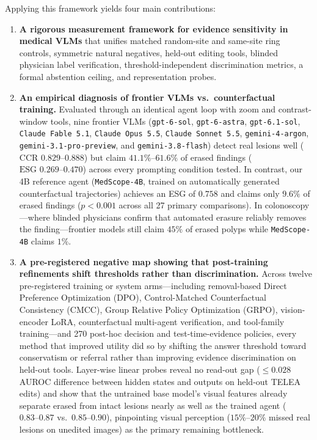 \documentclass{article} %
\begin{document}
Applying this framework yields four main contributions:
\begin{enumerate}[leftmargin=*,nosep]
    \item \textbf{A rigorous measurement framework for evidence sensitivity in medical VLMs} that unifies matched random-site and same-site ring controls, symmetric natural negatives, held-out editing tools, blinded physician label verification, threshold-independent discrimination metrics, a formal abstention ceiling, and representation probes.
    \item \textbf{An empirical diagnosis of frontier VLMs vs.\ counterfactual training.} Evaluated through an identical agent loop with zoom and contrast-window tools, nine frontier VLMs (\texttt{gpt-6-sol}, \texttt{gpt-6-astra}, \texttt{gpt-6.1-sol}, \texttt{Claude Fable 5.1}, \texttt{Claude Opus 5.5}, \texttt{Claude Sonnet 5.5}, \texttt{gemini-4-argon}, \texttt{gemini-3.1-pro-preview}, and \texttt{gemini-3.8-flash}) detect real lesions well ($\text{CCR } 0.829\text{--}0.888$) but claim $41.1\%\text{--}61.6\%$ of erased findings ($\text{ESG } 0.269\text{--}0.470$) across every prompting condition tested. In contrast, our 4B reference agent (\texttt{MedScope-4B}, trained on automatically generated counterfactual trajectories) achieves an ESG of $0.758$ and claims only $9.6\%$ of erased findings ($p < 0.001$ across all 27 primary comparisons). In colonoscopy---where blinded physicians confirm that automated erasure reliably removes the finding---frontier models still claim $45\%$ of erased polyps while \texttt{MedScope-4B} claims $1\%$.
    \item \textbf{A pre-registered negative map showing that post-training refinements shift thresholds rather than discrimination.} Across twelve pre-registered training or system arms---including removal-based Direct Preference Optimization (DPO), Control-Matched Counterfactual Consistency (CMCC), Group Relative Policy Optimization (GRPO), vision-encoder LoRA, counterfactual multi-agent verification, and tool-family training---and 270 post-hoc decision and test-time-evidence policies, every method that improved utility did so by shifting the answer threshold toward conservatism or referral rather than improving evidence discrimination on held-out tools. Layer-wise linear probes reveal no read-out gap ($\le 0.028$ AUROC difference between hidden states and outputs on held-out TELEA edits) and show that the untrained base model's visual features already separate erased from intact lesions nearly as well as the trained agent ($0.83\text{--}0.87$ vs.\ $0.85\text{--}0.90$), pinpointing visual perception ($15\%\text{--}20\%$ missed real lesions on unedited images) as the primary remaining bottleneck.

\end{enumerate}
\end{document}
